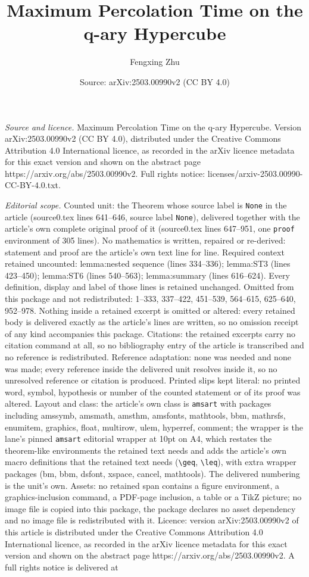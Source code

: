 \documentclass[10pt,a4paper]{amsart}
\title[Maximum Percolation Time on the q-ary Hypercube]{Maximum Percolation Time on the q-ary Hypercube}
\author{Fengxing Zhu}
\date{Source: arXiv:2503.00990v2 (CC BY 4.0)}
\begin{document}
\maketitle

\noindent\emph{Source and licence.} Maximum Percolation Time on the q-ary Hypercube. Version arXiv:2503.00990v2 (CC BY 4.0), distributed under the Creative Commons Attribution 4.0 International licence, as recorded in the arXiv licence metadata for this exact version and shown on the abstract page https://arxiv.org/abs/2503.00990v2. Full rights notice: licenses/arxiv-2503.00990-CC-BY-4.0.txt.\par\smallskip

\noindent\textit{Editorial scope.} Counted unit: the Theorem whose source label is \texttt{None} in the article (source0.tex lines 641--646, source label \texttt{None}), delivered together with the article's own complete original proof of it (source0.tex lines 647--951, one \texttt{proof} environment of 305 lines). No mathematics is written, repaired or re-derived: statement and proof are the article's own text line for line. Required context retained uncounted: lemma:nested sequence (lines 334--336); lemma:ST3 (lines 423--450); lemma:ST6 (lines 540--563); lemma:summary (lines 616--624). Every definition, display and label of those lines is retained unchanged. Omitted from this package and not redistributed: 1--333, 337--422, 451--539, 564--615, 625--640, 952--978. Nothing inside a retained excerpt is omitted or altered: every retained body is delivered exactly as the article's lines are written, so no omission receipt of any kind accompanies this package. Citations: the retained excerpts carry no citation command at all, so no bibliography entry of the article is transcribed and no reference is redistributed. Reference adaptation: none was needed and none was made; every reference inside the delivered unit resolves inside it, so no unresolved reference or citation is produced. Printed slips kept literal: no printed word, symbol, hypothesis or number of the counted statement or of its proof was altered. Layout and class: the article's own class is \texttt{amsart} with packages including amssymb, amsmath, amsthm, amsfonts, mathtools, bbm, mathrsfs, enumitem, graphics, float, multirow, ulem, hyperref, comment; the wrapper is the lane's pinned \texttt{amsart} editorial wrapper at 10pt on A4, which restates the theorem-like environments the retained text needs and adds the article's own macro definitions that the retained text needs (\texttt{\textbackslash geq}, \texttt{\textbackslash leq}), with extra wrapper packages (bm, bbm, dsfont, xspace, cancel, mathtools). The delivered numbering is the unit's own. Assets: no retained span contains a figure environment, a graphics-inclusion command, a PDF-page inclusion, a table or a TikZ picture; no image file is copied into this package, the package declares no asset dependency and no image file is redistributed with it. Licence: version arXiv:2503.00990v2 of this article is distributed under the Creative Commons Attribution 4.0 International licence, as recorded in the arXiv licence metadata for this exact version and shown on the abstract page https://arxiv.org/abs/2503.00990v2. A full rights notice is delivered at 
\end{document}
